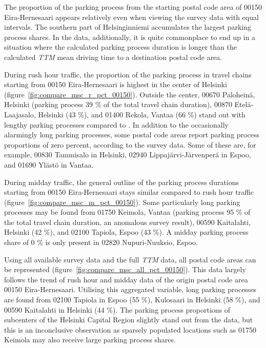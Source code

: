 The proportion of the parking process from the starting postal code area of 00150 Eira-Hernesaari appears relatively even when viewing the survey data with equal intervals. The southern part of Helsinginniemi accumulates the largest parking process shares. In the  data, additionally, it is quite commonplace to end up in a situation where the calculated parking process duration is longer than the calculated \textit{TTM} mean driving time to a destination postal code area.

During rush hour traffic, the proportion of the parking process in travel chains starting from 00150 Eira-Hernesaari is highest in the center of Helsinki (figure~\ref{fig:compare_msc_r_pct_00150}). Outside the center, 00670 Paloheinä, Helsinki (parking process 39 \% of the total travel chain duration), 00870 Etelä-Laajasalo, Helsinki (43 \%), and 01400 Rekola, Vantaa (66 \%) stand out with lengthy parking processes compared to . In addition to the occasionally alarmingly long parking processes, some postal code areas report parking process proportions of zero percent, according to the survey data. Some of these are, for example, 00830 Tammisalo in Helsinki, 02940 Lippajärvi-Järvenperä in Espoo, and 01690 Ylästö in Vantaa.

During midday traffic, the general outline of the parking process durations starting from 00150 Eira-Hernesaari stays similar compared to rush hour traffic (figure~\ref{fig:compare_msc_m_pct_00150}). Some particularly long parking processes may be found from 01750 Keimola, Vantaa (parking process 95 \% of the total travel chain duration, an anomalous survey result), 00590 Kaitalahti, Helsinki (42 \%), and 02100 Tapiola, Espoo (43 \%). A midday parking process share of 0 \% is only present in 02820 Nupuri-Nuuksio, Espoo.

Using all available survey data and the full \textit{TTM} data, all postal code areas can be represented (figure~\ref{fig:compare_msc_all_pct_00150}). This data largely follows the trend of rush hour and midday data of the origin postal code area 00150 Eira-Hernesaari. Utilising this aggregated variable, long parking processes are found from 02100 Tapiola in Espoo (55 \%), Kulosaari in Helsinki (58 \%), and 00590 Kaitalahti in Helsinki (44 \%). The parking process proportions of subcenters of the Helsinki Capital Region slightly stand out from the data, but this is an inconclusive observation as sparsely populated locations such as 01750 Keimola may also receive large parking process shares.


